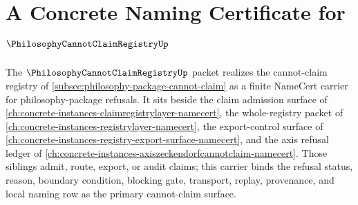 \chapter{A Concrete Naming Certificate for $\PhilosophyCannotClaimRegistryUp$}
\label{ch:concrete-instances-philosophy-cannot-claim-registry-namecert}

The $\PhilosophyCannotClaimRegistryUp$ packet realizes the cannot-claim registry of \autoref{subsec:philosophy-package-cannot-claim} as a finite NameCert carrier for philosophy-package refusals. It sits beside the claim admission surface of \autoref{ch:concrete-instances-claimregistrylayer-namecert}, the whole-registry packet of \autoref{ch:concrete-instances-registrylayer-namecert}, the export-control surface of \autoref{ch:concrete-instances-registry-export-surface-namecert}, and the axis refusal ledger of \autoref{ch:concrete-instances-axiszeckendorfcannotclaim-namecert}. Those siblings admit, route, export, or audit claims; this carrier binds the refusal status, reason, boundary condition, blocking gate, transport, replay, provenance, and local naming row as the primary cannot-claim surface.

